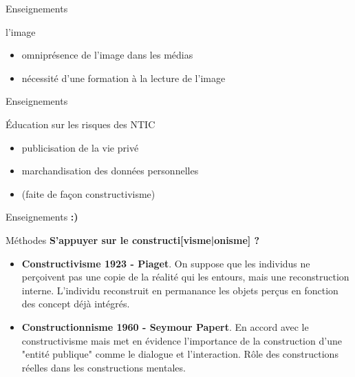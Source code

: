 \begin{frame}{Enseignements}
  \begin{block}{l'image}
    \begin{itemize}
      \item omniprésence de l'image dans les médias
      \item nécessité d'une formation à la lecture de l'image
    \end{itemize}
  \end{block}
\end{frame}
  
\begin{frame}{Enseignements}
  \begin{block}{Éducation sur les risques des NTIC}
    \begin{itemize}
      \item publicisation de la vie privé
      \item marchandisation des données personnelles
      \item (faite de façon constructivisme)
    \end{itemize}
  \end{block}
\end{frame} 



\begin{frame}{Enseignements}
\Huge \textbf{:)}
\end{frame}

\begin{frame}{Méthodes}
\textbf{\Huge  S'appuyer sur le constructi[visme|onisme] ?}
\begin{itemize}
  \item \textbf{Constructivisme 1923 - Piaget}. On suppose que les individus ne perçoivent pas une copie de la réalité qui les entours, mais une reconstruction interne. L'individu reconstruit en permanance les objets perçus en fonction des concept déjà intégrés.
  \item \textbf{Constructionnisme 1960 - Seymour Papert}. En accord avec le constructivisme mais met en évidence l'importance de la construction d'une "entité publique" comme le dialogue et l'interaction. Rôle des constructions réelles dans les constructions mentales.
\end{itemize}
\end{frame}

